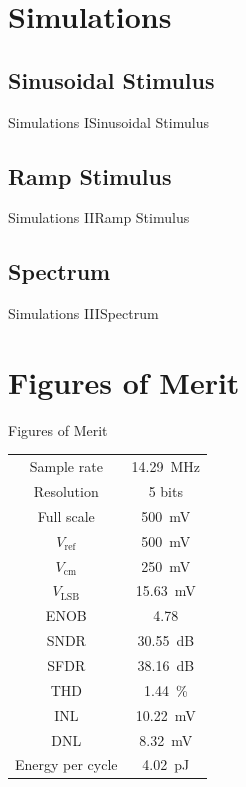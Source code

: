 \documentclass{beamer}
\newcommand*{\subb}[1]{\ensuremath{_{\mathrm{#1}}}}
\begin{document}
 \section{Simulations}
 \subsection{Sinusoidal Stimulus}
 \begin{frame}{Simulations I}{Sinusoidal Stimulus}
  \centering
  \resizebox{!}{0.8\textheight}{}
 \end{frame}

 \subsection{Ramp Stimulus}
 \begin{frame}{Simulations II}{Ramp Stimulus}
  \centering
  \resizebox{!}{0.8\textheight}{}
 \end{frame}

 \subsection{Spectrum}
 \begin{frame}{Simulations III}{Spectrum}
  \begin{center}
   
  \end{center}
 \end{frame}
 \AtBeginSection[]{}
 
 \section{Figures of Merit}
 \begin{frame}{Figures of Merit}
  \centering
  \begin{tabular}[]{cc}
   \toprule
   Sample rate      & \SI{14.29}{\MHz}\\
   Resolution       & 5 bits\\
   Full scale       & \SI{500}{\mV}\\
   $V\subb{ref}$    & \SI{500}{\mV}\\
   $V\subb{cm}$     & \SI{250}{\mV}\\
   $V\subb{LSB}$    & \SI{15.63}{\mV}\\\midrule
   ENOB             & \num{4.78}\\
   SNDR             & \SI{30.55}{dB}\\
   SFDR             & \SI{38.16}{dB}\\
   THD              & \SI{1.44}{\percent}\\
   INL              & \alert{\SI{10.22}{\mV}}\\
   DNL              & \alert{\SI{8.32}{\mV}}\\
   Energy per cycle & \SI{4.02}{\pico\joule}\\\bottomrule
  \end{tabular}
 \end{frame}
\end{document}
